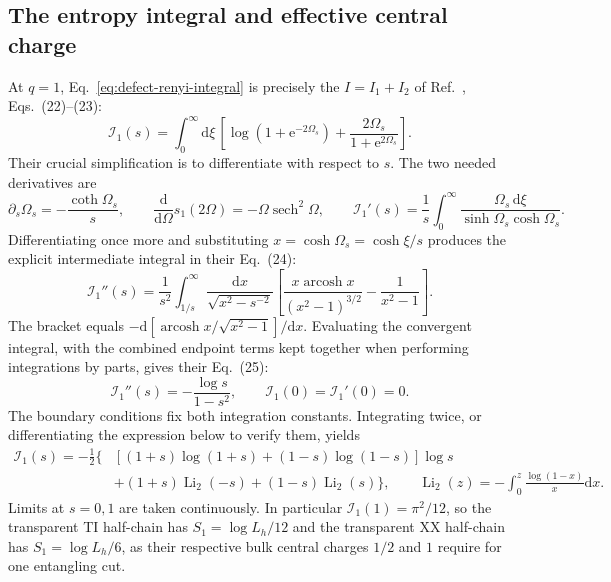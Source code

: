 \documentclass[aps,prb,onecolumn,nofootinbib,superscriptaddress]{revtex4-2}
\newcommand{\dd}{\mathrm{d}}
\newcommand{\e}{\mathrm{e}}
\begin{document}
\subsection{The entropy integral and effective central charge}
At $q=1$, Eq.~\eqref{eq:defect-renyi-integral} is precisely the
$I=I_1+I_2$ of Ref.~\cite{EislerPeschel2010}, Eqs.~(22)--(23):
\begin{equation}
 \mathcal I_1(s)=\int_0^\infty\dd\xi\,
 \left[\log(1+\e^{-2\Omega_s})
              +\frac{2\Omega_s}{1+\e^{2\Omega_s}}\right].
 \label{eq:defect-von-neumann-integral}
\end{equation}
Their crucial simplification is to differentiate with respect to $s$.
The two needed derivatives are
\begin{equation}
 \partial_s\Omega_s=-\frac{\coth\Omega_s}{s},\qquad
 \frac{\dd}{\dd\Omega}s_1(2\Omega)=-\Omega\operatorname{sech}^2\Omega,
 \qquad
 \mathcal I_1'(s)=\frac1s\int_0^\infty
       \frac{\Omega_s\,\dd\xi}{\sinh\Omega_s\cosh\Omega_s}.
 \label{eq:defect-first-derivative}
\end{equation}
Differentiating once more and substituting $x=\cosh\Omega_s=\cosh\xi/s$
produces the explicit intermediate integral in their Eq.~(24):
\begin{equation}
 \mathcal I_1''(s)=\frac{1}{s^2}\int_{1/s}^{\infty}
 \frac{\dd x}{\sqrt{x^2-s^{-2}}}
 \left[\frac{x\operatorname{arcosh}x}{(x^2-1)^{3/2}}
                         -\frac{1}{x^2-1}\right].
 \label{eq:defect-second-derivative-integral}
\end{equation}
The bracket equals
$-\dd[\operatorname{arcosh}x/\sqrt{x^2-1}]/\dd x$.
Evaluating the convergent integral, with the combined endpoint terms
kept together when performing integrations by parts, gives their
Eq.~(25):
\begin{equation}
 \mathcal I_1''(s)=-\frac{\log s}{1-s^2},\qquad
 \mathcal I_1(0)=\mathcal I_1'(0)=0.
 \label{eq:defect-dilog-ode}
\end{equation}
The boundary conditions fix both integration constants. Integrating
twice, or differentiating the expression below to verify them, yields
\begin{align}
 \mathcal I_1(s)=-\frac12\bigl\{&
 [(1+s)\log(1+s)+(1-s)\log(1-s)]\log s\nonumber\\
 &+(1+s)\operatorname{Li}_2(-s)
                    +(1-s)\operatorname{Li}_2(s)\bigr\},\qquad
 \operatorname{Li}_2(z)=-\int_0^z\frac{\log(1-x)}{x}\dd x .
 \label{eq:defect-dilog}
\end{align}
Limits at $s=0,1$ are taken continuously. In particular
$\mathcal I_1(1)=\pi^2/12$, so the transparent TI half-chain has
$S_1=\log L_h/12$ and the transparent XX half-chain has
$S_1=\log L_h/6$, as their respective bulk central charges $1/2$ and
$1$ require for one entangling cut.
\end{document}
